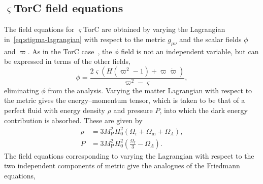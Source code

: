 \documentclass[aps,prd,reprint,preprintnumbers,showpacs,floatfix,nofootinbib,superscriptaddress]{revtex4-2}
\newcommand{\Mp}{M_\mathrm{P}^2}
\newcommand{\cpr}{\varpi}
\begin{document}
\subsection{$\varsigma$TorC field equations}
The field equations for $\varsigma$TorC are obtained by varying the Lagrangian in~\cref{eq:stigma-lagrangian} with respect to the metric $g_{\mu\nu}$ and the scalar fields $\phi$ and $\cpr$. As in the TorC case~\citep{Legner:2025hrt}, the $\phi$ field is not an independent variable, but can be expressed in terms of the other fields,
\begin{equation}
		\phi = \frac{2\varsigma\left(H\left(\cpr^2-1\right)+\cpr\dot{\cpr}\right)}{\cpr^2-\varsigma},
\label{eq:stigma-phi}
\end{equation}
eliminating $\phi$ from the analysis. Varying the matter Lagrangian with respect to the metric gives the energy--momentum tensor, which is taken to be that of a perfect fluid with energy density $\rho$ and pressure $P$, into which the dark energy contribution is absorbed. These are given by
\begin{equation}
\begin{aligned}\rho &= 3\Mp H_0^2\left(\Omega_\mathrm{r}+\Omega_\mathrm{m}+\Omega_\Lambda\right),\\ P &= 3\Mp H_0^2\left(\frac{\Omega_\mathrm{r}}{3}-\Omega_\Lambda\right).\end{aligned}
\label{eq:stigma-rho-P}
\end{equation}
The field equations corresponding to varying the Lagrangian with respect to the two independent components of metric give the analogues of the Friedmann equations,
\end{document}
